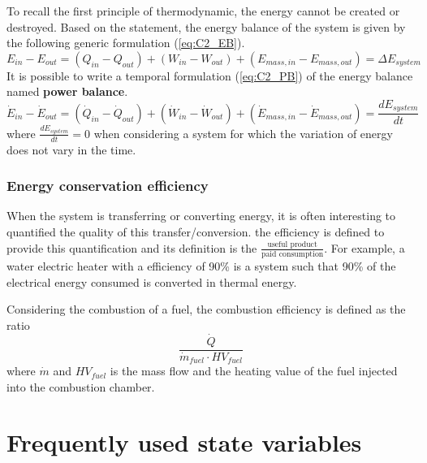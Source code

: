 To recall the first principle of thermodynamic, the energy cannot be created or destroyed. Based on the statement, the energy balance of the system is given by the following generic formulation (\ref{eq:C2_EB}).
\begin{equation}
    E_{in} - E_{out} = (Q_{in} - Q_{out}) + (W_{in} - W_{out}) + (E_{mass,in} - E_{mass,out}) = \Delta E_{system} \label{eq:C2_EB}
\end{equation}
It is possible to write a temporal formulation (\ref{eq:C2_PB}) of the energy balance named \textbf{power balance}.  
\begin{equation}
    \dot{E}_{in} - \dot{E}_{out} = (\dot{Q}_{in} - \dot{Q}_{out}) + (\dot{W}_{in} - \dot{W}_{out}) + (\dot{E}_{mass,in} - \dot{E}_{mass,out}) = \frac{dE_{system}}{dt} \label{eq:C2_PB}
\end{equation}
where $\frac{dE_{system}}{dt}=0$ when considering a system for which the variation of energy does not vary in the time.

\subsubsection{Energy conservation efficiency}
When the system is transferring or converting energy, it is often interesting to quantified the quality of this transfer/conversion. the efficiency is defined to provide this quantification and its definition is the
$\frac{\text{useful product}}{\text{paid consumption}}$. For example, a water electric heater with a efficiency of 90\% is a system such that 90\% of the electrical energy consumed is converted in thermal energy.  

Considering the combustion of a fuel, the combustion efficiency is defined as the ratio
$$ \frac{\dot{Q}}{\dot{m}_{fuel}\cdot HV_{fuel}}$$
where $\dot{m}$  and $HV_{fuel}$ is the mass flow and the heating value of the fuel injected into the combustion chamber.
\section{Frequently used state variables}